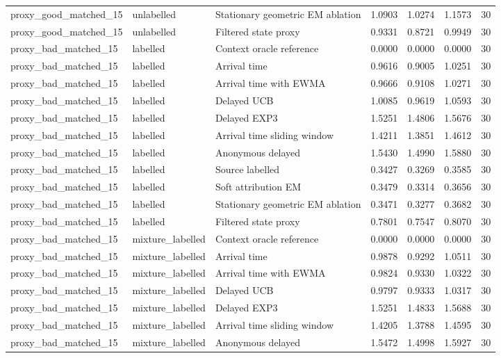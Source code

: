 \begin{tabular}{llllllr}
proxy\_good\_matched\_15 & unlabelled & Stationary geometric EM ablation & 1.0903 & 1.0274 & 1.1573 & 30 \\
proxy\_good\_matched\_15 & unlabelled & Filtered state proxy & 0.9331 & 0.8721 & 0.9949 & 30 \\
proxy\_bad\_matched\_15 & labelled & Context oracle reference & 0.0000 & 0.0000 & 0.0000 & 30 \\
proxy\_bad\_matched\_15 & labelled & Arrival time & 0.9616 & 0.9005 & 1.0251 & 30 \\
proxy\_bad\_matched\_15 & labelled & Arrival time with EWMA & 0.9666 & 0.9108 & 1.0271 & 30 \\
proxy\_bad\_matched\_15 & labelled & Delayed UCB & 1.0085 & 0.9619 & 1.0593 & 30 \\
proxy\_bad\_matched\_15 & labelled & Delayed EXP3 & 1.5251 & 1.4806 & 1.5676 & 30 \\
proxy\_bad\_matched\_15 & labelled & Arrival time sliding window & 1.4211 & 1.3851 & 1.4612 & 30 \\
proxy\_bad\_matched\_15 & labelled & Anonymous delayed & 1.5430 & 1.4990 & 1.5880 & 30 \\
proxy\_bad\_matched\_15 & labelled & Source labelled & 0.3427 & 0.3269 & 0.3585 & 30 \\
proxy\_bad\_matched\_15 & labelled & Soft attribution EM & 0.3479 & 0.3314 & 0.3656 & 30 \\
proxy\_bad\_matched\_15 & labelled & Stationary geometric EM ablation & 0.3471 & 0.3277 & 0.3682 & 30 \\
proxy\_bad\_matched\_15 & labelled & Filtered state proxy & 0.7801 & 0.7547 & 0.8070 & 30 \\
proxy\_bad\_matched\_15 & mixture\_labelled & Context oracle reference & 0.0000 & 0.0000 & 0.0000 & 30 \\
proxy\_bad\_matched\_15 & mixture\_labelled & Arrival time & 0.9878 & 0.9292 & 1.0511 & 30 \\
proxy\_bad\_matched\_15 & mixture\_labelled & Arrival time with EWMA & 0.9824 & 0.9330 & 1.0322 & 30 \\
proxy\_bad\_matched\_15 & mixture\_labelled & Delayed UCB & 0.9797 & 0.9333 & 1.0317 & 30 \\
proxy\_bad\_matched\_15 & mixture\_labelled & Delayed EXP3 & 1.5251 & 1.4833 & 1.5688 & 30 \\
proxy\_bad\_matched\_15 & mixture\_labelled & Arrival time sliding window & 1.4205 & 1.3788 & 1.4595 & 30 \\
proxy\_bad\_matched\_15 & mixture\_labelled & Anonymous delayed & 1.5472 & 1.4998 & 1.5927 & 30 \\

\end{tabular}
